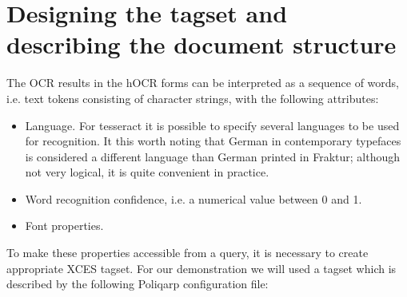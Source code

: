 \documentclass{article}
\begin{document}
\section{Designing the tagset and describing the document structure}
\label{sec:design-tags-docum}

The OCR results in the hOCR forms can be interpreted as a sequence of
words, i.e. text tokens consisting of character strings, with the
following attributes:
\begin{itemize}
\item Language. For tesseract it is possible to specify several
  languages to be used for recognition. It this worth noting that
  German in contemporary typefaces is considered a different language
  than German printed in Fraktur; although not very logical, it is
  quite convenient in practice.
\item Word recognition confidence, i.e. a numerical value between 0
  and 1.
\item Font properties.
\end{itemize}

To make these properties accessible from a query, it is necessary to
create appropriate XCES tagset. For our demonstration we will used a
tagset which is described by the following Poliqarp configuration
file:



\end{document}
